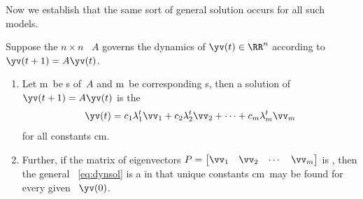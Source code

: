 Now we establish that the same sort of general solution occurs for all such models.


\begin{theorem} \label{thm:dynsol}
Suppose the \(n\times n\) ~\(A\) governs the dynamics of \(\yv(t)\in\RR^n\) according to \(\yv(t+1)=A\yv(t)\).
\begin{enumerate}
\item\label{thm:dynsola} Let \hlist\lambda m\ be s of~\(A\) and \hlist\vv m\ be corresponding s, then a solution of \(\yv(t+1)=A\yv(t)\) is the 
\begin{equation}
\yv(t)=c_1\lambda_1^t\vv_1+c_2\lambda_2^t\vv_2+\cdots+c_m\lambda_m^t\vv_m
\label{eq:dynsol}
\end{equation}
for all constants \hlist cm.

\sloppy
\item\label{thm:dynsolb} Further, if 
the matrix of eigenvectors \(P=\begin{bmatrix} \vv_1&\vv_2&\cdots&\vv_m \end{bmatrix}\) is , then the general ~\eqref{eq:dynsol} is a  in that unique constants \hlist cm\ may be found for every given ~\(\yv(0)\).
\end{enumerate}
\end{theorem}

